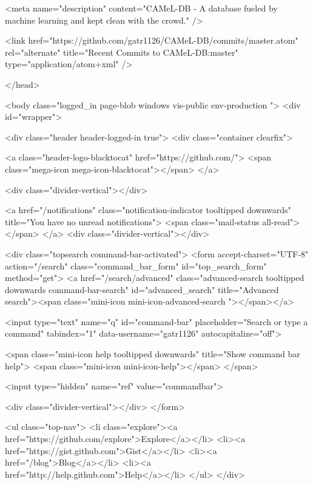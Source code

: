     <meta name="description" content="CAMeL-DB - A database fueled by machine learning and kept clean with the crowd." />

  <link href="https://github.com/gatr1126/CAMeL-DB/commits/master.atom" rel="alternate" title="Recent Commits to CAMeL-DB:master" type="application/atom+xml" />

  </head>


  <body class="logged_in page-blob windows vis-public env-production ">
    <div id="wrapper">

      

      

      


        <div class="header header-logged-in true">
          <div class="container clearfix">

            <a class="header-logo-blacktocat" href="https://github.com/">
  <span class="mega-icon mega-icon-blacktocat"></span>
</a>

            <div class="divider-vertical"></div>

              <a href="/notifications" class="notification-indicator tooltipped downwards" title="You have no unread notifications">
    <span class="mail-status all-read"></span>
  </a>
  <div class="divider-vertical"></div>


              
  <div class="topsearch command-bar-activated">
    <form accept-charset="UTF-8" action="/search" class="command_bar_form" id="top_search_form" method="get">
  <a href="/search/advanced" class="advanced-search tooltipped downwards command-bar-search" id="advanced_search" title="Advanced search"><span class="mini-icon mini-icon-advanced-search "></span></a>

  <input type="text" name="q" id="command-bar" placeholder="Search or type a command" tabindex="1" data-username="gatr1126" autocapitalize="off">

  <span class="mini-icon help tooltipped downwards" title="Show command bar help">
    <span class="mini-icon mini-icon-help"></span>
  </span>

  <input type="hidden" name="ref" value="commandbar">

  <div class="divider-vertical"></div>
</form>



    <ul class="top-nav">
        <li class="explore"><a href="https://github.com/explore">Explore</a></li>
        <li><a href="https://gist.github.com">Gist</a></li>
        <li><a href="/blog">Blog</a></li>
      <li><a href="http://help.github.com">Help</a></li>
    </ul>
  </div>


